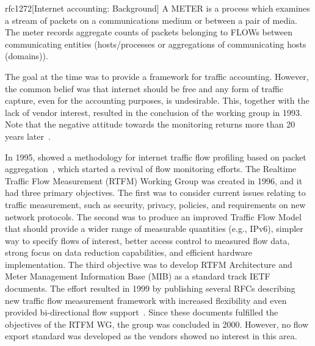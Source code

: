 \begin{displaycquote}{rfc1272}[Internet accounting: Background]
A METER is a process which examines a stream of packets on a communications medium or between a pair of media. The meter records aggregate counts of packets belonging to FLOWs between communicating entities (hosts/processes or aggregations of communicating hosts (domains)).
\end{displaycquote}

The goal at the time was to provide a framework for traffic accounting. However, the common belief was that internet should be free and any form of traffic capture, even for the accounting purposes, is undesirable. This, together with the lack of vendor interest, resulted in the conclusion of the working group in 1993. Note that the negative attitude towards the monitoring returns more than 20 years later~\cite{rfc7258}.

In 1995, \citeauthor{Claffy-1995-Parameterizable} showed a methodology for internet traffic flow profiling based on packet aggregation~\cite{Claffy-1995-Parameterizable}, which started a revival of flow monitoring efforts. The Realtime Traffic Flow  Measurement (RTFM) Working Group was created in 1996, and it had three primary objectives. The first was to consider current issues relating to traffic measurement, such as security, privacy, policies, and requirements on new network protocols. The second was to produce an improved Traffic Flow Model that should provide a wider range of measurable quantities (e.g., IPv6), simpler way to specify flows of interest, better access control to measured flow data, strong focus on data reduction capabilities, and efficient hardware implementation. The third objective was to develop RTFM Architecture and Meter Management Information Base (MIB) as a standard track IETF documents. The effort resulted in 1999 by publishing several RFCs describing new traffic flow measurement framework with increased flexibility and even provided bi-directional flow support~\cite{rfc2722}. Since these documents fulfilled the objectives of the RTFM WG, the group was concluded in 2000. However, no flow export standard was developed as the vendors showed no interest in this area.

